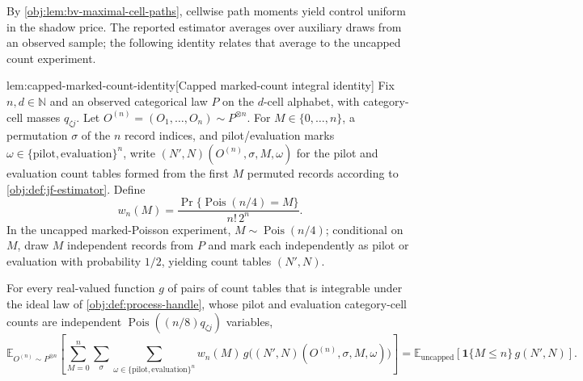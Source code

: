 \documentclass[11pt]{article}
\begin{document}
By \cref{obj:lem:bv-maximal-cell-paths}, cellwise path moments yield control uniform in the shadow price. The reported estimator averages over auxiliary draws from an observed sample; the following identity relates that average to the uncapped count experiment.

\begin{lemmav}{lem:capped-marked-count-identity}[Capped marked-count integral identity]
Fix \(n,d\in\mathbb N\) and an observed categorical law \(P\) on the \(d\)-cell alphabet, with category-cell masses \(q_{\zeta j}\). Let \(O^{(n)}=(O_1,\ldots,O_n)\sim P^{\otimes n}\). For \(M\in\{0,\ldots,n\}\), a permutation \(\sigma\) of the \(n\) record indices, and pilot/evaluation marks \(\omega\in\{\mathrm{pilot},\mathrm{evaluation}\}^n\), write \((N',N)(O^{(n)},\sigma,M,\omega)\) for the pilot and evaluation count tables formed from the first \(M\) permuted records according to \cref{obj:def:jf-estimator}. Define
\[
w_n(M)=\frac{\Pr\{\operatorname{Pois}(n/4)=M\}}{n!\,2^n}.
\]
In the uncapped marked-Poisson experiment, \(M\sim\operatorname{Pois}(n/4)\); conditional on \(M\), draw \(M\) independent records from \(P\) and mark each independently as pilot or evaluation with probability \(1/2\), yielding count tables \((N',N)\).

For every real-valued function \(g\) of pairs of count tables that is integrable under the ideal law of \cref{obj:def:process-handle}, whose pilot and evaluation category-cell counts are independent \(\operatorname{Pois}((n/8)q_{\zeta j})\) variables,
\[
\mathbb E_{O^{(n)}\sim P^{\otimes n}}\left[
\sum_{M=0}^{n}\sum_{\sigma}\sum_{\omega\in\{\mathrm{pilot},\mathrm{evaluation}\}^n}
w_n(M)\,
g\bigl((N',N)(O^{(n)},\sigma,M,\omega)\bigr)
\right]
=
\mathbb E_{\mathrm{uncapped}}\left[
\mathbf 1\{M\leq n\}\,g(N',N)
\right].
\]
\end{lemmav}
\end{document}

